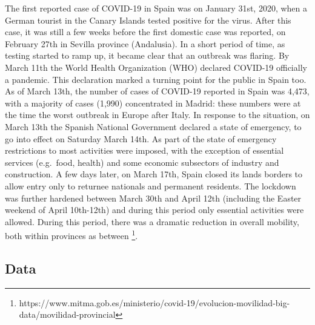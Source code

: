 \documentclass[]{elsarticle} %
\begin{document}
The first reported case of COVID-19 in Spain was on January 31st, 2020,
when a German tourist in the Canary Islands tested positive for the
virus. After this case, it was still a few weeks before the first
domestic case was reported, on February 27th in Sevilla province
(Andalusia). In a short period of time, as testing started to ramp up,
it became clear that an outbreak was flaring. By March 11th the World
Health Organization (WHO) declared COVID-19 officially a pandemic. This
declaration marked a turning point for the public in Spain too. As of
March 13th, the number of cases of COVID-19 reported in Spain was 4,473,
with a majority of cases (1,990) concentrated in Madrid: these numbers
were at the time the worst outbreak in Europe after Italy. In response
to the situation, on March 13th the Spanish National Government declared
a state of emergency, to go into effect on Saturday March 14th. As part
of the state of emergency restrictions to most activities were imposed,
with the exception of essential services (e.g.~food, health) and some
economic subsectors of industry and construction. A few days later, on
March 17th, Spain closed its lands borders to allow entry only to
returnee nationals and permanent residents. The lockdown was further
hardened between March 30th and April 12th (including the Easter weekend
of April 10th-12th) and during this period only essential activities
were allowed. During this period, there was a dramatic reduction in
overall mobility, both within provinces as between
\footnote{https://www.mitma.gob.es/ministerio/covid-19/evolucion-movilidad-big-data/movilidad-provincial}.

\hypertarget{data}{%
\subsection{Data}\label{data}}
\end{document}
